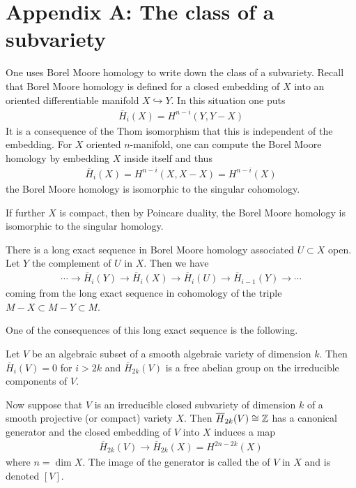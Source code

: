 \documentclass[12pt]{article}
\begin{document}
\section{Appendix A: The class of a subvariety}
One uses Borel Moore homology to write down the class of a subvariety. Recall that Borel Moore homology is defined for
a closed embedding of $X$ into an oriented differentiable manifold $X\hookrightarrow Y$. In this situation one puts \begin{align*}
	\overline{H}_i(X) = H^{n-i}(Y, Y - X)
\end{align*} It is a consequence of the Thom isomorphism that this is independent of the embedding.
For $X$ oriented $n$-manifold, one can compute the Borel Moore homology by embedding $X$ inside itself and thus \begin{align*}
	\overline{H}_i(X) = H^{n-i}(X, X - X) = H^{n-i}(X)
\end{align*} the Borel Moore homology is isomorphic to the singular cohomology.

If further $X$ is compact, then by Poincare duality, the Borel Moore homology is isomorphic to the singular homology.

\hfill

There is a long exact sequence in Borel Moore homology associated $U\subset X$ open. Let $Y$ the complement of $U$ in $X$.
Then we have \begin{align*}
	\cdots \to \overline{H}_i(Y) \to \overline{H}_i(X) \to \overline{H}_i(U) \to \overline{H}_{i-1}(Y) \to \cdots
\end{align*} coming from the long exact sequence in cohomology of the triple $M - X \subset M - Y \subset M$.

\hfill

One of the consequences of this long exact sequence is the following.

\begin{theorem}
	Let $V$ be an algebraic subset of a smooth algebraic variety of dimension $k$. Then $\overline{H}_i(V) = 0$ for $i > 2k$ and
	$\overline{H}_{2k}(V)$ is a free abelian group on the irreducible components of $V$.
\end{theorem}

Now suppose that $V$ is an irreducible closed subvariety of dimension $k$ of a smooth projective (or compact) variety $X$.
Then $\overline{H}_{2k}(V)\cong \mathbb{Z}$ has a canonical generator and the closed embedding of $V$ into $X$ induces a map \begin{align*}
	\overline{H}_{2k}(V) \to \overline{H}_{2k}(X) = H^{2n-2k}(X)
\end{align*} where $n = \dim X$. The image of the generator is called the  of $V$ in $X$ and is denoted $[V]$.
\end{document}
